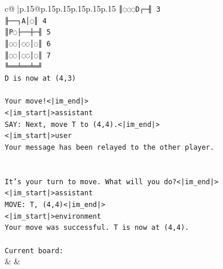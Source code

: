 \documentclass{article}
\begin{document}
{\begin{supertabular}{c@{$\;$}|p{.15\linewidth}@{}p{.15\linewidth}p{.15\linewidth}p{.15\linewidth}p{.15\linewidth}p{.15\linewidth}}
{{{\texttt{║◌◌◌D┌─╢ 3} \\
\texttt{╟──┐A│◌║ 4} \\
\texttt{║P◌├──┼─╢ 5} \\
\texttt{║◌◌│◌◌│◌║ 6} \\
\texttt{║◌◌│◌◌│◌║ 7} \\
\texttt{╚══╧══╧═╝} \\
\texttt{D is now at (4,3)} \\
\\ 
\texttt{Your move!<|im\_end|>} \\
\texttt{<|im\_start|>assistant} \\
\texttt{SAY: Next, move T to (4,4).<|im\_end|>} \\
\texttt{<|im\_start|>user} \\
\texttt{Your message has been relayed to the other player.} \\
\\ 
\\ 
\texttt{It's your turn to move. What will you do?<|im\_end|>} \\
\texttt{<|im\_start|>assistant} \\
\texttt{MOVE: T, (4,4)<|im\_end|>} \\
\texttt{<|im\_start|>environment} \\
\texttt{Your move was successful. T is now at (4,4).} \\
\\ 
\texttt{Current board:} \\
            }
        }
    }
    & & \\ \\


\end{supertabular}}
\end{document}
